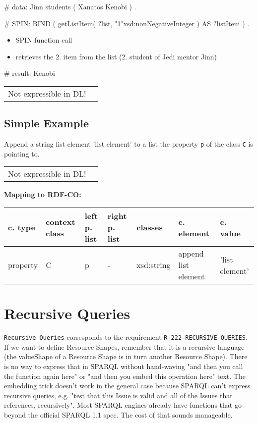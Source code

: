 \documentclass{llncs}
\newcommand{\ms}[1]{\texttt{#1}}
\newenvironment{gcotable}{
  \scriptsize
  \sffamily
  \vspace{0cm}
	\begin{center}
	\textbf{\vspace{0.4cm}Mapping to RDF-CO:} \\
  \begin{tabular}{l|l|l|l|l|l|l}
	\hline
  \textbf{c. type} & \textbf{context class} & \textbf{left p. list} & \textbf{right p. list} & \textbf{classes} & \textbf{c. element} & \textbf{c. value} \\
  \hline

}{
  \hline
  \end{tabular}
	\end{center}
}
\newenvironment{DL}{
  \vspace{0cm}
	\begin{center}
  \begin{tabular}{r l}

}{
  \end{tabular}
	\end{center}
}
\begin{document}
\begin{ex}
# data:
Jinn students 
     ( Xanatos Kenobi ) . 
\end{ex}

\begin{ex}
# SPIN:
BIND ( getListItem( ?list, "1"xsd:nonNegativeInteger ) AS ?listItem ) .
\end{ex}

\begin{itemize}
  \item SPIN function call
	\item retrieves the 2. item from the list (2. student of Jedi mentor Jinn)
\end{itemize}

\begin{ex}
# result:
Kenobi
\end{ex}

\begin{DL}
Not expressible in DL!
\end{DL}

\subsection{Simple Example}

Append a string list element 'list element' to a list the property \ms{p} of the class \ms{C} is pointing to.

\begin{DL}
Not expressible in DL!
\end{DL}

\begin{gcotable}
property & C & p & - & xsd:string & append list element & 'list element' \\
\end{gcotable}

\section{Recursive Queries}

\ms{Recursive Queries} corresponds to the requirement
\ms{R-222-RECURSIVE-QUERIES}.
If we want to define Resource Shapes, remember that it is a recursive
language (the valueShape of a Resource Shape is in turn another
Resource Shape). There is no way to express that in SPARQL without
hand-waving "and then you call the function again here" or "and then
you embed this operation here" text.  The embedding trick doesn't work
in the general case because SPARQL can't express recursive queries,
e.g. "test that this Issue is valid and all of the Issues that
references, recursively".
Most SPARQL engines already have
functions that go beyond the official SPARQL 1.1 spec. The cost of that
sounds manageable.
\end{document}
